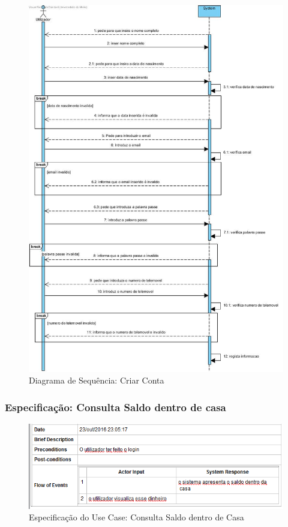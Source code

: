 \begin{figure}[htb!]
	\centering
	\includegraphics[scale=0.55]{imagens/diagramaSeq/CriarConta}  
	\caption{Diagrama de Sequência: Criar Conta}  
\end{figure}

\newpage
\subsubsection{Especificação: Consulta Saldo dentro de casa }
\begin{figure}[htb!]
	\centering
	\includegraphics[scale=0.6]{imagens/Especificacoes/consultasaldodentrodecasa}  
	\caption{Especificação do Use Case: Consulta Saldo dentro de Casa   }  
\end{figure}

